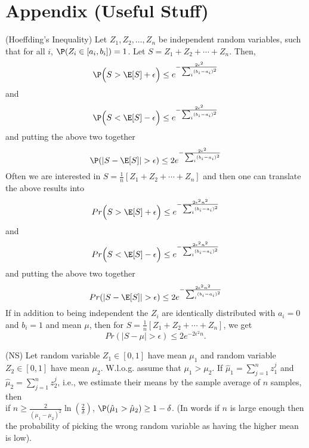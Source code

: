 \section{Appendix (Useful Stuff)}
\begin{theorem} (Hoeffding's Inequality) Let $Z_1,Z_2,\ldots,Z_n$ be independent random variables, such that for all $i$, $\P(Z_i \in [a_i,b_i]) = 1$. Let $S = Z_1 + Z_2 + \cdots + Z_n$. Then,
\[
\P \Big(S > \E[S] + \epsilon \Big)  \leq e^{-\frac{2 \epsilon^2}{\sum_i (b_i - a_i)^2} }
\]
and
\[
\P \Big(S < \E[S] - \epsilon \Big)  \leq e^{-\frac{2 \epsilon^2}{\sum_i (b_i - a_i)^2} }
\]
and putting the above two together
\[
\P(|S -\E[S]| > \epsilon) \leq 2 e^{-\frac{2 \epsilon^2}{\sum_i (b_i - a_i)^2} }
\]
Often we are interested in $S = \frac{1}{n} [Z_1 + Z_2 + \cdots + Z_n]$ and then one can translate the above results into
\[
Pr \Big(S > \E[S] + \epsilon \Big)  \leq e^{-\frac{2 \epsilon^2 n^2}{\sum_i (b_i - a_i)^2} }
\]
and
\[
Pr \Big(S < \E[S] - \epsilon \Big)  \leq e^{-\frac{2 \epsilon^2 n^2}{\sum_i (b_i - a_i)^2} }
\]
and putting the above two together
\[
Pr(|S - \E[S]| > \epsilon) \leq 2 e^{-\frac{2 \epsilon^2 n^2}{\sum_i (b_i - a_i)^2} }
\]
If in addition to being independent the $Z_i$ are identically distributed with $a_i = 0$ and $b_i = 1$ and mean $\mu$, then for $S = \frac{1}{n} [Z_1 + Z_2 + \cdots + Z_n]$, we get
\[
Pr(|S - \mu| > \epsilon) \leq 2 e^{-2 \epsilon^2 n}.
\]
\end{theorem}


\begin{theorem} (NS) Let random variable $Z_1 \in [0,1]$ have mean $ \mu_1$ and random variable $Z_2 \in [0,1]$ have mean $\mu_2$. W.l.o.g. assume that $\mu_1 > \mu_2$. If $\hat{\mu}_1 = \sum_{j = 1}^n z^j_1$ and $\hat{\mu}_2 = \sum_{j = 1}^n z^j_2$, i.e., we estimate their means by the sample average of $n$ samples, then \\ if $n \geq \frac{2}{(\mu_1 - \mu_2)^2} \ln(\frac{2}{\delta})$, $\P(\hat{\mu}_1 > \hat{\mu}_2) \geq 1 - \delta$.  (In words if $n$ is large enough then the probability of picking the wrong random variable as having the higher mean is low).
\end{theorem}

